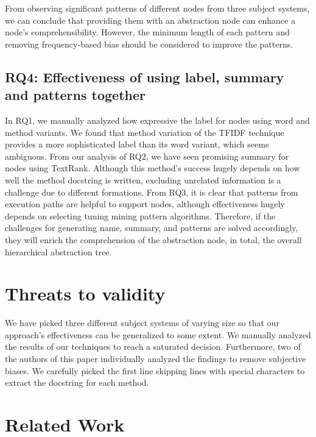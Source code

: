 From observing significant patterns of different nodes from three subject systems, we can conclude that providing them with an abstraction node can enhance a node's comprehensibility. However, the minimum length of each pattern and removing frequency-based bias should be considered to improve the patterns.
\subsection{ RQ4: Effectiveness of using label, summary and patterns together}

In RQ1, we manually analyzed how expressive the label for nodes using word and method variants. We found that method variation of the TFIDF technique provides a more sophisticated label than its word variant, which seems ambiguous. From our analysis of RQ2, we have seen promising summary for nodes using TextRank. Although this method's success hugely depends on how well the method docstring is written, excluding unrelated information is a challenge due to different formations. From RQ3, it is clear that patterns from execution paths are helpful to support nodes, although effectiveness hugely depends on selecting tuning mining pattern algorithms. Therefore, if the challenges for generating name, summary, and patterns are solved accordingly, they will enrich the comprehension of the abstraction node, in total, the overall hierarchical abstraction tree. 

\section{Threats to validity}

We have picked three different subject systems of varying size so that our approach's effectiveness can be generalized to some extent. We manually analyzed the results of our techniques to reach a saturated decision. Furthermore, two of the authors of this paper individually analyzed the findings to remove subjective biases. We carefully picked the first line skipping lines with special characters to extract the docstring for each method. 
\section{Related Work}
\label{related}
